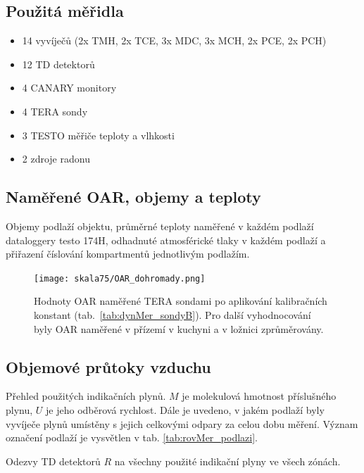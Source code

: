 \subsection{Použitá měřidla}
\begin{itemize}
    \setlength\itemsep{0em}
	\item 14 vyvíječů (2x TMH, 2x TCE, 3x MDC, 3x MCH, 2x PCE, 2x PCH)
	\item 12 TD detektorů
	\item 4 CANARY monitory
	\item 4 TERA sondy
	\item 3 TESTO měřiče teploty a vlhkosti
	\item 2 zdroje radonu
\end{itemize}

\subsection{Naměřené OAR, objemy a teploty}

\begin{table}[H]
    \centering
    \caption{Objemy podlaží objektu, průměrné teploty naměřené v každém podlaží dataloggery testo 174H, odhadnuté atmosférické tlaky v každém podlaží a přiřazení číslování kompartmentů jednotlivým podlažím.}
    \label{tab:skala75_objemy}
    
\end{table}
\begin{figure}[H]
    \centering
    \texttt{[image: skala75/OAR\_dohromady.png]}
    \caption{Hodnoty OAR naměřené TERA sondami po aplikování kalibračních konstant (tab.~\ref{tab:dynMer_sondyB}). Pro další vyhodnocování byly OAR naměřené v přízemí v kuchyni a v ložnici zprůměrovány.}
    \label{fig:skala75_OARdohromady}
\end{figure}
\subsection{Objemové průtoky vzduchu}

\begin{table}[H]
    \centering
    \caption{Přehled použitých indikačních plynů. $M$ je molekulová hmotnost příslušného plynu, $U$ je jeho odběrová rychlost. Dále je uvedeno, v jakém podlaží byly vyvíječe plynů umístěny s jejich celkovými odpary za celou dobu měření. Význam označení podlaží je vysvětlen v tab. \ref{tab:rovMer_podlazi}.}
    \label{tab:skala75_indikacniPlyny}
    
\end{table}
\begin{table}[H]
    \centering
    \caption{Odezvy TD detektorů $R$ na všechny použité indikační plyny ve všech zónách.}
    \label{tab:skala75_odezvyTD}
    
\end{table}

